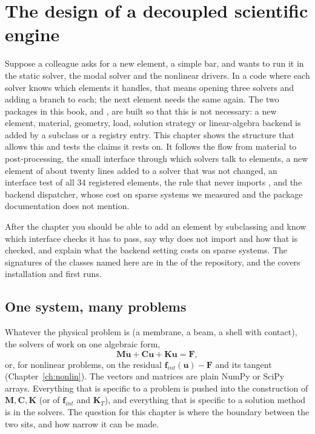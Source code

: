 \chapter{The design of a decoupled scientific engine}\label{ch:arch}

\begin{tcolorbox}[colback=hpale,colframe=hnavy!60,coltitle=white,colbacktitle=hnavy!85,title={In this chapter}]
Suppose a colleague asks for a new element, a simple bar, and wants to run it in the static solver, the modal solver and the nonlinear drivers. In a code where each solver knows which elements it handles, that means opening three solvers and adding a branch to each; the next element needs the same again. The two packages in this book, \fea{} and \rom{}, are built so that this is not necessary: a new element, material, geometry, load, solution strategy or linear-algebra backend is added by a subclass or a registry entry. This chapter shows the structure that allows this and tests the claims it rests on. It follows the flow from material to post-processing, the small interface through which solvers talk to elements, a new element of about twenty lines added to a solver that was not changed, an interface test of all 34 registered elements, the rule that \rom{} never imports \fea{}, and the backend dispatcher, whose cost on sparse systems we measured and the package documentation does not mention.\par\smallskip
After the chapter you should be able to add an element by subclassing and know which interface checks it has to pass, say why \rom{} does not import \fea{} and how that is checked, and explain what the  backend setting costs on sparse systems. The signatures of the classes named here are in the  of the repository, and the  covers installation and first runs.
\end{tcolorbox}

\section{One system, many problems}\label{sec:ar-system}

Whatever the physical problem is (a membrane, a beam, a shell with contact), the solvers of \fea{} work on one algebraic form,
\begin{equation}\label{eq:ar-system}
\bm M\ddot{\bm u}+\bm C\dot{\bm u}+\bm K\bm u=\bm F ,
\end{equation}
or, for nonlinear problems, on the residual $\bm f_{int}(\bm u)-\bm F$ and its tangent (Chapter~\ref{ch:nonlin}). The vectors and matrices are plain NumPy or SciPy arrays. Everything that is specific to a problem is pushed into the construction of $\bm M,\bm C,\bm K$ (or of $\bm f_{int}$ and $\bm K_T$), and everything that is specific to a solution method is in the solvers. The question for this chapter is where the boundary between the two sits, and how narrow it can be made.

